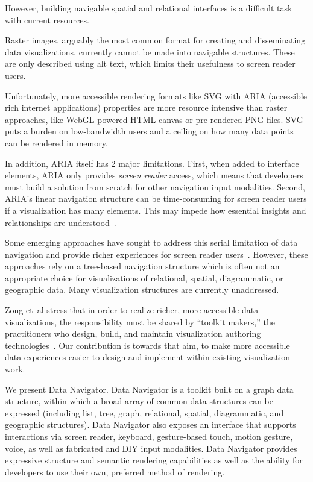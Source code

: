\documentclass[12pt]{cmuthesis}
\newcommand{\ea}{{et~al\xperiod}\xspace}
\begin{document}
However, building navigable spatial and relational interfaces is a difficult task with current resources.

Raster images, arguably the most common format for creating and disseminating data visualizations, currently cannot be made into navigable structures. These are only described using alt text, which limits their usefulness to screen reader users.

Unfortunately, more accessible rendering formats like SVG with ARIA (accessible rich internet applications) properties are more resource intensive than raster approaches, like WebGL-powered HTML canvas or pre-rendered PNG files. SVG puts a burden on low-bandwidth users and a ceiling on how many data points can be rendered in memory.

In addition, ARIA itself has 2 major limitations. First, when added to interface elements, ARIA only provides \textit{screen reader} access, which means that developers must build a solution from scratch for other navigation input modalities. Second, ARIA's linear navigation structure can be time-consuming for screen reader users if a visualization has many elements. This may impede how essential insights and relationships are understood~\cite{Sorge2016Polyfilling,Godfrey2018Accessible,Zong2022Rich,Thompson2023Chart,Jung2022Communicating,Sharif2021}.

Some emerging approaches have sought to address this serial limitation of data navigation and provide richer experiences for screen reader users~\cite{Sorge2016Polyfilling,Godfrey2018Accessible,Zong2022Rich,Thompson2023Chart}. However, these approaches rely on a tree-based navigation structure which is often not an appropriate choice for visualizations of relational, spatial, diagrammatic, or geographic data. Many visualization structures are currently unaddressed.

Zong \ea stress that in order to realize richer, more accessible data visualizations, the responsibility must be shared by ``toolkit makers,'' the practitioners who design, build, and maintain visualization authoring technologies~\cite{Zong2022Rich}. Our contribution is towards that aim, to make more accessible data experiences easier to design and implement within existing visualization work.

We present Data Navigator. Data Navigator is a toolkit built on a graph data structure, within which a broad array of common data structures can be expressed (including list, tree, graph, relational, spatial, diagrammatic, and geographic structures). Data Navigator also exposes an interface that supports interactions via screen reader, keyboard, gesture-based touch, motion gesture, voice, as well as fabricated and DIY input modalities. Data Navigator provides expressive structure and semantic rendering capabilities as well as the ability for developers to use their own, preferred method of rendering.
\end{document}
